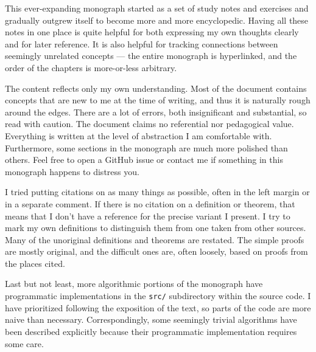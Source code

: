 
This ever-expanding monograph started as a set of study notes and exercises and gradually outgrew itself to become more and more encyclopedic. Having all these notes in one place is quite helpful for both expressing my own thoughts clearly and for later reference. It is also helpful for tracking connections between seemingly unrelated concepts --- the entire monograph is hyperlinked, and the order of the chapters is more-or-less arbitrary.

The content reflects only my own understanding. Most of the document contains concepts that are new to me at the time of writing, and thus it is naturally rough around the edges. There are a lot of errors, both insignificant and substantial, so read with caution. The document claims no referential nor pedagogical value. Everything is written at the level of abstraction I am comfortable with. Furthermore, some sections in the monograph are much more polished than others. Feel free to open a GitHub issue or contact me if something in this monograph happens to distress you.

I tried putting citations on as many things as possible, often in the left margin or in a separate comment. If there is no citation on a definition or theorem, that means that I don't have a reference for the precise variant I present. I try to mark my own definitions to distinguish them from one taken from other sources. Many of the unoriginal definitions and theorems are restated. The simple proofs are mostly original, and the difficult ones are, often loosely, based on proofs from the places cited.

Last but not least, more algorithmic portions of the monograph have programmatic implementations in the \texttt{src/} subdirectory within the source code. I have prioritized following the exposition of the text, so parts of the code are more naive than necessary. Correspondingly, some seemingly trivial algorithms have been described explicitly because their programmatic implementation requires some care.

